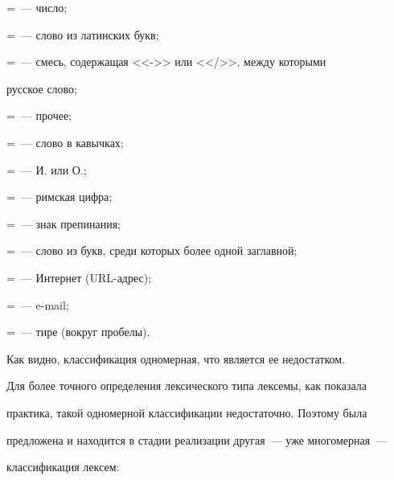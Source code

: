    =~--- число;


   


   =~--- слово из латинских букв;


   


   =~--- смесь, содержащая <<->> или <</>>, между которыми 


русское слово;


   


   =~--- прочее;


   


   =~--- слово в кавычках;


   


   =~--- И. или О.;


   


   =~--- римская цифра;


   


   =~--- знак препинания;





   =~--- слово из букв, среди которых более одной заглавной;


   


   =~--- Интернет (URL-адрес);


   


   =~--- e-mail;


   


   =~--- тире (вокруг пробелы).


   


Как видно, классификация одномерная, что является ее недостатком.


   


   Для более точного определения лексического типа лексемы, как показала 


практика, такой одномерной классификации недостаточно. Поэтому  была 


предложена и находится в стадии реализации другая~--- уже многомерная~--- 


классификация лексем:


